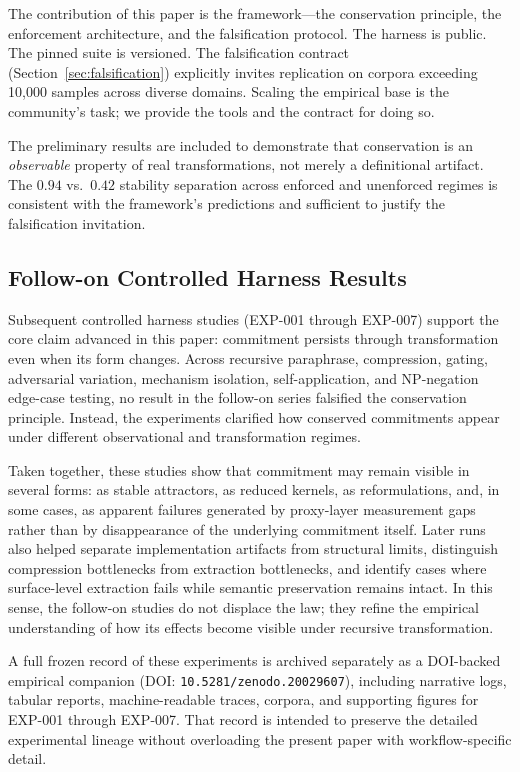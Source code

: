 \documentclass[11pt,a4paper]{article}
\begin{document}
The contribution of this paper is the framework---the conservation principle, the enforcement architecture, and the falsification protocol. The harness is public. The pinned suite is versioned. The falsification contract (Section~\ref{sec:falsification}) explicitly invites replication on corpora exceeding 10,000 samples across diverse domains. Scaling the empirical base is the community's task; we provide the tools and the contract for doing so.

The preliminary results are included to demonstrate that conservation is an \emph{observable} property of real transformations, not merely a definitional artifact. The $0.94$ vs.\ $0.42$ stability separation across enforced and unenforced regimes is consistent with the framework's predictions and sufficient to justify the falsification invitation.

\subsection{Follow-on Controlled Harness Results}
\label{sec:followon-results}

Subsequent controlled harness studies (EXP-001 through EXP-007) support the core claim advanced in this paper: commitment persists through transformation even when its form changes. Across recursive paraphrase, compression, gating, adversarial variation, mechanism isolation, self-application, and NP-negation edge-case testing, no result in the follow-on series falsified the conservation principle. Instead, the experiments clarified how conserved commitments appear under different observational and transformation regimes.

Taken together, these studies show that commitment may remain visible in several forms: as stable attractors, as reduced kernels, as reformulations, and, in some cases, as apparent failures generated by proxy-layer measurement gaps rather than by disappearance of the underlying commitment itself. Later runs also helped separate implementation artifacts from structural limits, distinguish compression bottlenecks from extraction bottlenecks, and identify cases where surface-level extraction fails while semantic preservation remains intact. In this sense, the follow-on studies do not displace the law; they refine the empirical understanding of how its effects become visible under recursive transformation.

A full frozen record of these experiments is archived separately as a DOI-backed empirical companion (DOI: \texttt{10.5281/zenodo.20029607}), including narrative logs, tabular reports, machine-readable traces, corpora, and supporting figures for EXP-001 through EXP-007. That record is intended to preserve the detailed experimental lineage without overloading the present paper with workflow-specific detail.
\end{document}

